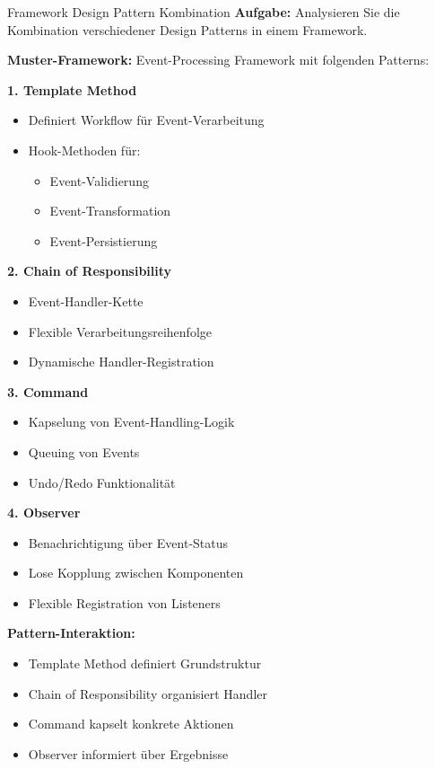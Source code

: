 \begin{example2}{Framework Design Pattern Kombination}
\textbf{Aufgabe:} 
Analysieren Sie die Kombination verschiedener Design Patterns in einem Framework.

\textbf{Muster-Framework:}
Event-Processing Framework mit folgenden Patterns:

\textbf{1. Template Method}
\begin{itemize}
    \item Definiert Workflow für Event-Verarbeitung
    \item Hook-Methoden für:
    \begin{itemize}
        \item Event-Validierung
        \item Event-Transformation
        \item Event-Persistierung
    \end{itemize}
\end{itemize}

\textbf{2. Chain of Responsibility}
\begin{itemize}
    \item Event-Handler-Kette
    \item Flexible Verarbeitungsreihenfolge
    \item Dynamische Handler-Registration
\end{itemize}

\textbf{3. Command}
\begin{itemize}
    \item Kapselung von Event-Handling-Logik
    \item Queuing von Events
    \item Undo/Redo Funktionalität
\end{itemize}

\textbf{4. Observer}
\begin{itemize}
    \item Benachrichtigung über Event-Status
    \item Lose Kopplung zwischen Komponenten
    \item Flexible Registration von Listeners
\end{itemize}

\textbf{Pattern-Interaktion:}
\begin{itemize}
    \item Template Method definiert Grundstruktur
    \item Chain of Responsibility organisiert Handler
    \item Command kapselt konkrete Aktionen
    \item Observer informiert über Ergebnisse
\end{itemize}
\end{example2}

